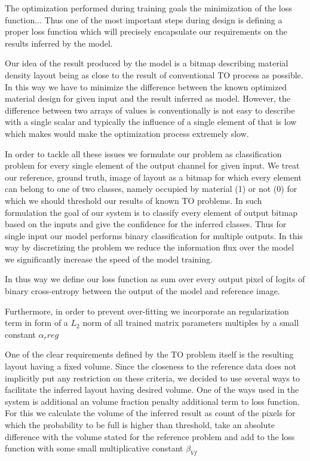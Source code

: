 The optimization performed during training goals the minimization of the loss function...
Thus one of the most important steps during design is defining a proper loss function which will precisely encapsulate our requirements on the results inferred by the model.

Our idea of the result produced by the model is a bitmap describing material density layout being as close to the result of conventional TO process as possible.
In this way we have to minimize the difference between the known optimized material design for given input and the result inferred as model.
However, the difference between two arrays of values is conventionally is not easy to describe with a single scalar and typically the influence of a single element of that is low which makes would make the optimization process extremely slow.

In order to tackle all these issues we formulate our problem as classification problem for every single element of the output channel for given input. 
We treat our reference, ground truth, image of layout as a bitmap for which every element can belong to one of two classes, namely occupied by material ({1})  or not ({0}) for which we should threshold our results of known TO problems.
In such formulation the goal of our system is to classify every element of output bitmap based on the inputs and give the confidence for the inferred classes.
Thus for single input our model performs binary classification for multiple outputs.
In this way by discretizing the problem we reduce the information flux over the model we significantly increase the speed of the model training.

In thus way we define our loss function as sum over every output pixel of logits of binary cross-entropy between the output of the model and reference image.


Furthermore, in order to prevent over-fitting we incorporate an regularization term in form of a $L_{2}$ norm of all trained matrix parameters multiples by a small constant $\alpha_r{reg}$

One of the clear requirements defined by the TO problem itself is the resulting layout having a fixed volume. 
Since the closeness to the reference data does not implicitly put any restriction on these criteria, we decided to use several ways to facilitate the inferred layout having desired volume.
One of the ways used in the system is additional an volume fraction penalty additional term to loss function.
For this we calculate the volume of the inferred result as count of the pixels for which the probability to be full is higher than threshold, take an absolute difference with the volume stated for the reference problem and add to the loss function with some small multiplicative constant $\beta_{Vf}$
